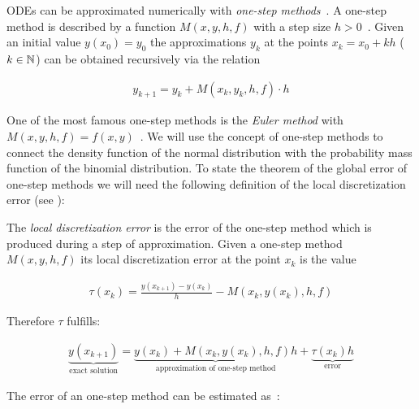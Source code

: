 ODEs can be approximated numerically with \emph{one-step methods}~\cite[pp.~471~ff]{stoer}. A one-step method is described by a function $M(x,y,h,f)$ with a step size $h>0$~\cite[p.~473]{stoer}. Given an initial value $y(x_0)=y_0$ the approximations $y_k$ at the points $x_k = x_0 + kh$ ($k\in\mathbb N$) can be obtained recursively via the relation \cite[p. 473]{stoer}

\begin{align}
  y_{k+1} = y_k + M(x_k, y_k, h, f) \cdot h
\end{align}

One of the most famous one-step methods is the \emph{Euler method} with $M(x,y,h,f) = f(x,y)$~\cite[p. 473]{stoer}. We will use the concept of one-step methods to connect the density function of the normal distribution with the probability mass function of the binomial distribution. To state the theorem of the global error of one-step methods we will need the following definition of the local discretization error (see \cite[pp. 473-474]{stoer}):

\begin{definition}
  The \emph{local discretization error} is the error of the one-step method which is produced during a step of approximation. Given a one-step method $M(x,y,h,f)$ its local discretization error at the point $x_k$ is the value

  \begin{align}
    \tau(x_k) = \frac{y(x_{k+1})-y(x_k)}h - M(x_k,y(x_k),h,f)
  \end{align}
\end{definition}

\noindent Therefore $\tau$ fulfills:

\begin{align}
  \underbrace{y(x_{k+1})}_{\text{exact solution}} = \underbrace{y(x_k) + M(x_k,y(x_k),h,f)h}_{\text{approximation of one-step method}} + \underbrace{\tau(x_k)h}_{\text{error}}
\end{align}

\noindent The error of an one-step method can be estimated as~\cite[pp. 478-479]{stoer}:

